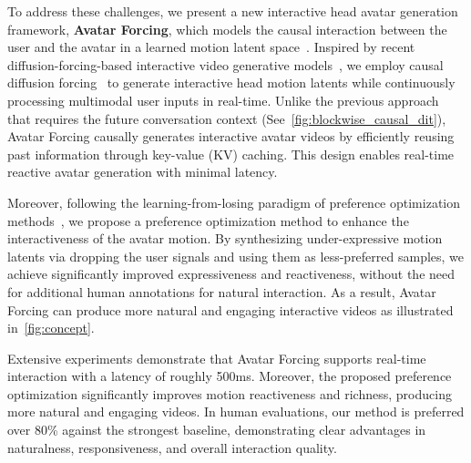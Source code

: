 To address these challenges, we present a new interactive head avatar generation framework, \textbf{Avatar Forcing}, which models the causal interaction between the user and the avatar in a learned motion latent space~\citep{lia, float}. Inspired by recent diffusion-forcing-based interactive video generative models~\citep{self_forcing, causvid, genie3}, we employ causal diffusion forcing~\citep{diffusion_forcing, causvid, streamdit} to generate interactive head motion latents while continuously processing multimodal user inputs in real-time. Unlike the previous approach~\citep{infp} that requires the future conversation context (See~\cref{fig:blockwise_causal_dit}), Avatar Forcing causally generates interactive avatar videos by efficiently reusing past information through key-value (KV) caching. This design enables real-time reactive avatar generation with minimal latency.

Moreover, following the learning-from-losing paradigm of preference optimization methods~\citep{ouyang2022training, rafailov2023dpo, wallace2024diffusiondpo}, we propose a preference optimization method to enhance the interactiveness of the avatar motion. By synthesizing under-expressive motion latents via dropping the user signals and using them as less-preferred samples,
we achieve significantly improved expressiveness and reactiveness, without the need for additional human annotations for natural interaction. As a result, Avatar Forcing can produce more natural and engaging interactive videos as illustrated in~\cref{fig:concept}.


Extensive experiments demonstrate that Avatar Forcing supports real-time interaction with a latency of roughly 500ms. Moreover, the proposed preference optimization significantly improves motion reactiveness and richness, producing more natural and engaging videos. In human evaluations, our method is preferred over 80\% against the strongest baseline, demonstrating clear advantages in naturalness, responsiveness, and overall interaction quality. 
